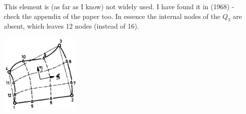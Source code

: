 
This element is (as far as I know) not widely used. I have found it in 
\textcite{eriz68} (1968) - check the appendix of the paper too. 
In essence the internal nodes of the $Q_3$ are absent, 
which leaves 12 nodes (instead of 16).

\begin{center}
\includegraphics[width=4cm]{images/elements/Q3_12}
\end{center}



